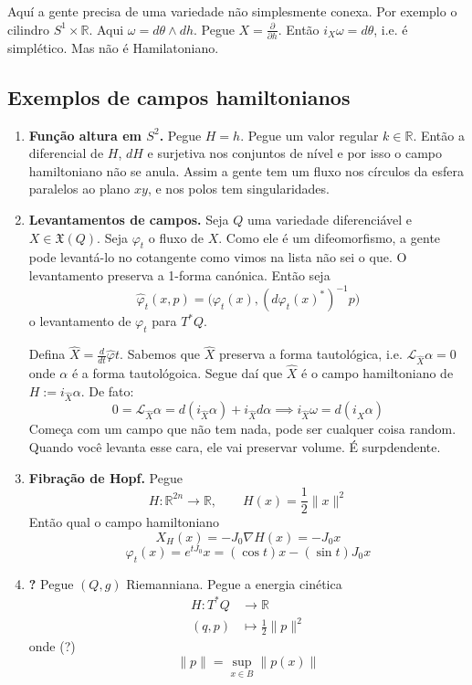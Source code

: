 \begin{remark} Aquí a gente precisa de uma variedade não simplesmente conexa. Por exemplo o cilindro $S^1\times \mathbb{R}$. Aqui $\omega=d\theta\wedge dh$. Pegue $X=\frac{\partial }{\partial h}$. Então $i_X\omega=d\theta$, i.e. é simplético. Mas não é Hamilatoniano.
\end{remark}

\subsection{Exemplos de campos hamiltonianos}

\begin{enumerate}
	\item \textbf{Função altura em $S^2$.} Pegue  $H=h$. Pegue um valor regular  $k\in \mathbb{R}$. Então a diferencial de  $H$, $dH$ e surjetiva nos conjuntos de nível e por isso o campo hamiltoniano não se anula. Assim a gente tem um fluxo nos círculos da esfera paralelos ao plano $xy$, e nos polos tem singularidades.

	\item \textbf{Levantamentos de campos.} Seja $Q$ uma variedade diferenciável e $X\in\mathfrak{X}(Q)$. {\color{8}Seja $\varphi_t$ o fluxo de $X$. Como ele é um difeomorfismo, a gente pode levantá-lo no cotangente como vimos na lista não sei o que. O levantamento preserva a 1-forma canónica.} Então seja \[\hat{\varphi}_t(x,p)=\Big(\varphi_t(x),(d\varphi_t(x)^*)^{-1}p\Big)\] o levantamento de $\varphi_t$ para $T^*Q$.

		Defina $\hat{X}=\frac{d}{dt}\hat{\varphi}t$. Sabemos que $\hat{X}$ preserva a forma tautológica, i.e. $\mathcal{L}_{\hat{X}}\alpha=0$ onde $\alpha$ é a forma tautológoica. Segue daí que $\hat{X}$ é o campo hamiltoniano de $H:=i_{\hat{X}}\alpha$. De fato:
		\[0=\mathcal{L}_{\hat{X}}\alpha=d(i_{\hat{X}}\alpha)+i_{\hat{X}}d\alpha\implies i_{\hat{X}}\omega=d(i_{\hat{X}}\alpha)\]
{\color{8}Começa com um campo que não tem nada, pode ser cualquer coisa random. Quando você levanta esse cara, ele vai preservar volume. É surpdendente.}
	
\item \textbf{Fibração de Hopf.} Pegue 
	\[H:\mathbb{R}^{2n}\longrightarrow \mathbb{R},\qquad H(x)=\frac{1}{2}\|x\|^2\]
	Então qual o campo hamiltoniano
	\[X_H(x)=-J_0\nabla H(x)=-J_0x\]
	\[\varphi_t(x)=e^{t J_0}x=(\cos t)x-(\sin t)J_0x\]

\item \textbf{?} Pegue $(Q,g)$ Riemanniana.  Pegue a energia cinética
\begin{align*}
	H: T^*Q &\longrightarrow \mathbb{R} \\
	(q,p) &\longmapsto \frac{1}{2}\|p\|^2
\end{align*}
onde (?)
 \[\|p\|=\operatorname{s u p }_{x\in B}\|p(x)\|\]


\end{enumerate}
